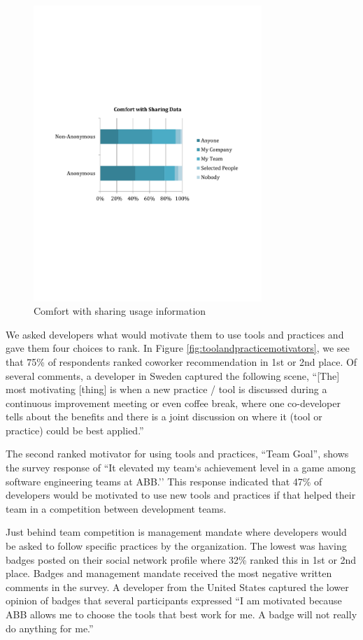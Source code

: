 \documentclass{sig-alternate}
\begin{document}
\begin{figure}
	\includegraphics[width=3.4in]{ComfortWithSharing.pdf}
	\caption{Comfort with sharing usage information}
	\label{fig:comfortwithsharing}
\end{figure}

We asked developers what would motivate them to use tools and practices and gave them four choices to rank.  In Figure \ref{fig:toolandpracticemotivators}, we see that 75\% of respondents ranked coworker recommendation in 1st or 2nd place.  Of several comments, a developer in Sweden captured the following scene, ``[The] most motivating [thing] is when a new practice / tool is discussed during a continuous improvement meeting or even coffee break, where one co-developer tells about the benefits and there is a joint discussion on where it (tool or practice) could be best applied.''  

The second ranked motivator for using tools and practices, ``Team Goal'', shows the survey response of ``It elevated my team`s achievement level in a game among software engineering teams at ABB.''   This response indicated that 47\% of developers would be motivated to use new tools and practices if that helped their team in a competition between development teams.   

Just behind team competition is management mandate where developers would be asked to follow specific practices by the organization.  The lowest was having badges posted on their social network profile where 32\% ranked this in 1st or 2nd place.   Badges and management mandate received the most negative written comments in the survey.  A developer from the United States captured the lower opinion of badges that several participants expressed ``I am motivated because ABB allows me to choose the tools that best work for me. A badge will not really do anything for me.'' 
\end{document}
